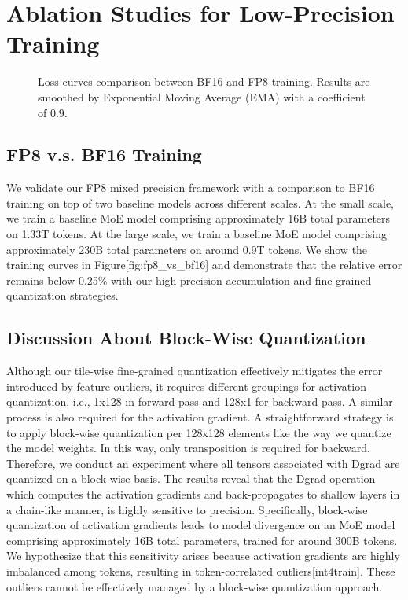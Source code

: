\documentclass[11pt,a4paper]{article}
\begin{document}
\section{Ablation Studies for Low-Precision Training}

\begin{figure}[h]
\caption{Loss curves comparison between BF16 and FP8 training. Results are smoothed by Exponential Moving Average (EMA) with a coefficient of 0.9.}
\end{figure}

\subsection{FP8 v.s. BF16 Training}

We validate our FP8 mixed precision framework with a comparison to BF16 training on top of two baseline models across different scales. At the small scale, we train a baseline MoE model comprising approximately 16B total parameters on 1.33T tokens. At the large scale, we train a baseline MoE model comprising approximately 230B total parameters on around 0.9T tokens. We show the training curves in Figure[fig:fp8\_vs\_bf16] and demonstrate that the relative error remains below 0.25\% with our high-precision accumulation and fine-grained quantization strategies.

\subsection{Discussion About Block-Wise Quantization}

Although our tile-wise fine-grained quantization effectively mitigates the error introduced by feature outliers, it requires different groupings for activation quantization, i.e., 1x128 in forward pass and 128x1 for backward pass. A similar process is also required for the activation gradient. A straightforward strategy is to apply block-wise quantization per 128x128 elements like the way we quantize the model weights. In this way, only transposition is required for backward. Therefore, we conduct an experiment where all tensors associated with Dgrad are quantized on a block-wise basis. The results reveal that the Dgrad operation which computes the activation gradients and back-propagates to shallow layers in a chain-like manner, is highly sensitive to precision. Specifically, block-wise quantization of activation gradients leads to model divergence on an MoE model comprising approximately 16B total parameters, trained for around 300B tokens. We hypothesize that this sensitivity arises because activation gradients are highly imbalanced among tokens, resulting in token-correlated outliers[int4train]. These outliers cannot be effectively managed by a block-wise quantization approach.
\end{document}
